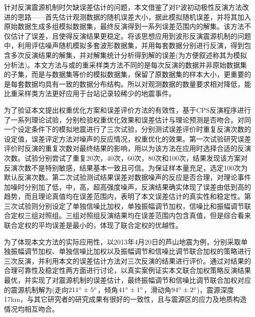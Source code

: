针对反演震源机制时欠缺误差估计的问题，本文借鉴了\citet{Hardebeck2002}对P波初动极性反演方法改进的思路——首先估计观测数据的随机误差大小，据此模拟随机误差，并将其加入原始数据生成多组模拟数据集，最终反演得到一系列误差范围内的解集。该方法不仅估计了误差，且使得反演结果更稳定\citep{Hardebeck2002}。将该思想应用到波形反演震源机制的问题中，利用评估噪声随机模拟多套波形数据集，并用每套数据分别进行反演，得到包含多次反演结果的解集，并对解集统计分析得到解的误差(为方便叙述称其为模拟分析法)。本文方法与或\citet{Efron1979}的重采样类方法不同的是每次反演的数据并非原始数据集的子集，而是与数据集等价的模拟数据集，保留了原数据集的样本大小，更重要的是每套数据均具有一致的数据分布结构。所以对观测数据的数量要求相对降低，能比重采样类方法更好应用于台站记录较稀少的地震事件。

为了验证本文提出权重优化方案和误差评价方法的有效性，基于CPS反演程序进行了一系列理论试验，分别检验权重优化效果和误差估计与理论预测是否吻合。对同一个设定条件下的模拟地震进行了三次试验，分别测试误差评价时重复反演次数的设定值，误差评定方法对噪声的反应情况，权重优化的效果。第一次试验研究误差评价时反演的重复次数对最终结果的影响，用以为该方法在应用时选择合适的反演次数。试验分别尝试了重复20次，40次，60次，80次和100次，结果发现该方案对反演次数不是特别敏感，结果基本一致且可信。为保证样本量充足，选定100次为默认反演次数。第二次试验测试结果误差对数据噪声的反应是否合理，对理论事件加噪时分别加了低，中，高，超高强度噪声，反演结果确实体现了误差由低到高的趋势，而且理论真值均在误差范围内，表明了本文误差估计的真实性和稳定性。第三次试验则分别设定了单独信噪比加权，单独振幅调节加权，信噪比和振幅调节联合定权三组对照组。三组对照组反演结果均在误差范围内包含真值，但是综合看来联合定权的平均误差是最小的，体现了联合定权的优越性。

为了体现本文方法的实际应用性，以2013年4月20日的芦山地震为例，分别采取单独振幅调节加权、单独信噪比加权以及振幅调节和信噪比调节联合加权的策略进行三次反演，并利用本文的误差估计方法对三次反演的结果进行评价。通过对结果的合理可靠性及稳定性两方面进行讨论，以真实案例证实本文联合加权策略反演结果最优，并实现了对震源机制的误差估计，最终振幅调节和信噪比调节联合加权对应的震源机制解为(走向$211^\circ\pm5^\circ$，倾角$41^\circ\pm1^\circ$，滑动角$94^\circ\pm2^\circ$)，震源深度17km，与其它研究者的研究成果有很好的一致性，且与震源区的应力及地质构造情况均相互吻合。
